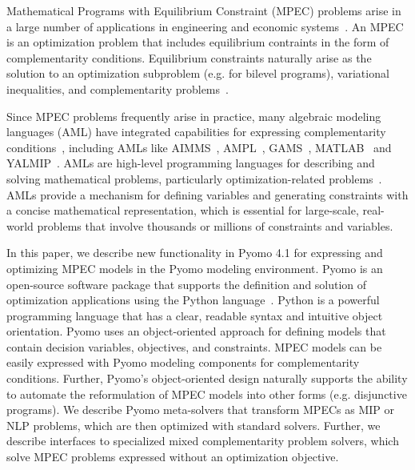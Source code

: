 
\lstset{language=Python}
\lstset{aboveskip=1em,belowskip=1em,showspaces=false,showstringspaces=false}



Mathematical Programs with Equilibrium Constraint (MPEC) problems
arise in a large number of applications in engineering and economic
systems~\cite{FerPan97,LouPanRal96,OutKocZow98}.  An MPEC is an
optimization problem that includes equilibrium contraints in the
form of complementarity conditions.  Equilibrium constraints naturally
arise as the solution to an optimization subproblem (e.g. for bilevel
programs), variational inequalities, and
complementarity problems~\cite{HarPan90}.

Since MPEC problems frequently arise in practice, many algebraic
modeling languages (AML) have integrated capabilities for expressing
complementarity conditions~\cite{Mun00}, including AMLs like\linebreak
AIMMS~\citep{AIMMS}, AMPL~\citep{AMPL,FouGay03}, GAMS~\citep{GAMS},
MATLAB~\cite{MATLAB} and YALMIP~\cite{Lof04}.  AMLs are high-level
programming languages for describing
and solving mathematical problems, particularly optimization-related
problems~\citep{Kal04}.  AMLs provide a mechanism for defining
variables and generating constraints with a concise mathematical
representation, which is essential for large-scale, real-world
problems that involve thousands or millions of constraints and
variables.

In this paper, we describe new functionality in Pyomo 4.1 for expressing and
optimizing MPEC models in the Pyomo modeling environment.  Pyomo is an
open-source software package that supports
the definition and solution of optimization applications using the
Python language~\cite{pyomotrac,pyomoweb,HarWatWoo11,HarLaiWatWoo12}.  Python is a powerful 
programming language that has a clear, readable syntax and
intuitive object orientation.  Pyomo uses an object-oriented approach
for defining models that contain decision variables, objectives,
and constraints.  MPEC models can be easily expressed with Pyomo
modeling components for complementarity conditions.  Further, Pyomo's
object-oriented design naturally supports the ability to automate
the reformulation of MPEC models into other forms (e.g. disjunctive
programs).  We describe Pyomo meta-solvers that transform MPECs as
MIP or NLP problems, which are then optimized with standard solvers.  Further,
we describe interfaces to specialized mixed complementarity problem
solvers, which
solve MPEC problems expressed without an optimization objective.


